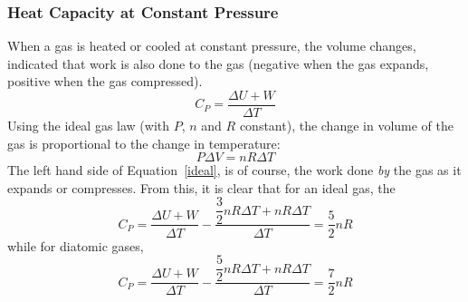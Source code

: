 \documentclass[11pt]{article}
\begin{document}
\subsubsection{Heat Capacity at Constant Pressure}
When a gas is heated or cooled at constant pressure, the volume changes,
indicated that work is also done to the gas (negative when the gas expands,
positive when the gas compressed).
\begin{equation}
  C_P=\frac{\Delta U+W}{\Delta T}
\end{equation}
Using the ideal gas law (with $P$, $n$ and $R$ constant), the change in volume
of the gas is proportional to the change in temperature:
\begin{equation}
  P\Delta V=nR\Delta T
  \label{ideal}
\end{equation}
The left hand side of Equation~\ref{ideal}, is of course, the work done
\emph{by} the gas as it expands or compresses. From this, it is clear that
for an ideal gas, the
\begin{equation}
  C_P=\frac{\Delta U+W}{\Delta T}- \frac{\dfrac32nR\Delta T+nR\Delta T}
  {\Delta T}=\frac52nR
\end{equation}
while for diatomic gases,
\begin{equation}
  C_P=\frac{\Delta U+W}{\Delta T}- \frac{\dfrac52nR\Delta T+nR\Delta T}
  {\Delta T}=\frac72nR
\end{equation}
%
%
\end{document}

